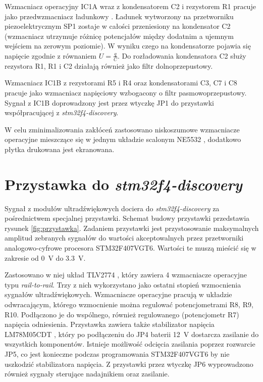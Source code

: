 
Wzmacniacz operacyjny IC1A wraz z kondensatorem C2 i rezystorem R1 pracuje 
jako przedwzmacniacz ładunkowy \cite{bib:wzm_ladunkowy}.
Ładunek wytworzony na przetworniku piezoelektrycznym SP1 zostaje w całości przeniesiony na kondensator C2 
(wzmacniacz utrzymuje różnicę potencjałów między dodatnim a ujemnym wejściem na zerowym poziomie).
W wyniku czego na kondensatorze pojawia się napięcie zgodnie z równaniem $U=\frac{q}{C}$.
Do rozładowania kondensatora C2 służy rezystora R1,
R1 i C2 działają również jako filtr dolnoprzepustowy.

Wzmacniacz IC1B z rezystorami R5 i R4 oraz kondensatorami C3, C7 i C8 pracuje jako wzmacniacz napięciowy wzbogacony o 
filtr pasmowoprzepustowy.
Sygnał z IC1B doprowadzony jest przez wtyczkę JP1 do przystawki współpracującej z \textit{stm32f4-discovery}.

W celu zminimalizowania zakłóceń zastosowano niskoszumowe wzmacniacze operacyjne
mieszczące się w jednym układzie scalonym NE5532 \cite{bib:ne5532}, 
dodatkowo płytka drukowana jest ekranowana.


\section{Przystawka do \textit{stm32f4-discovery}}

Sygnał z modułów ultradźwiękowych dociera do \textit{stm32f4-discovery} za pośrednictwem specjalnej przystawki.
Schemat budowy przystawki przedstawia rysunek \ref{fig:przystawka}.
Zadaniem przystawki jest przystosowanie maksymalnych amplitud zebranych sygnałów do wartości akceptowalnych przez  
przetworniki analogowo-cyfrowe procesora STM32F407VGT6.
Wartości te muszą mieścić się w zakresie od \SI{0}{V} do \SI{3,3}{V}.

Zastosowano w niej układ TLV2774 \cite{bib:TLV2774}, który zawiera 4 wzmacniacze operacyjne typu
\textit{rail-to-rail}. Trzy z nich wykorzystano jako ostatni stopień wzmocnienia sygnałów ultradźwiękowych. 
Wzmacniacze operacyjne pracują w układzie odwracającym, którego wzmocnienie można regulować potencjometrami R8, R9, R10. 
Podłączono je do wspólnego, również regulowanego (potencjometr R7) napięcia odniesienia.
Przystawka zawiera także stabilizator napięcia LM78M05CDT \cite{bib:LM78M05CDT}, który po podłączeniu 
do JP4 baterii \SI{12}{V} dostarcza zasilanie do wszystkich komponentów. 
Istnieje możliwość odcięcia zasilania poprzez rozwarcie JP5, co jest konieczne podczas programowania
STM32F407VGT6 by nie uszkodzić stabilizatora napięcia.
Z przystawki przez wtyczkę JP6 wyprowadzono również sygnały sterujące nadajnikiem oraz zasilanie.

